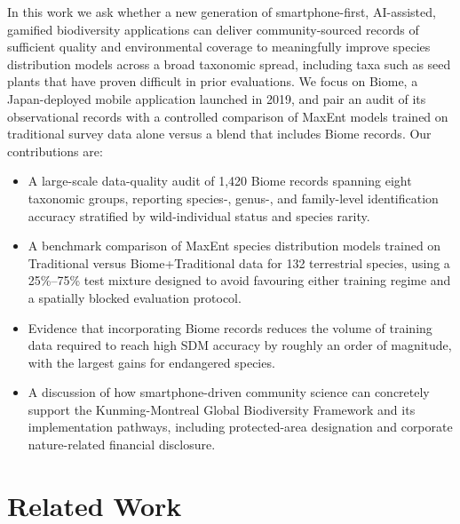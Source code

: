 In this work we ask whether a new generation of smartphone-first, AI-assisted, gamified biodiversity applications can deliver community-sourced records of sufficient quality and environmental coverage to meaningfully improve species distribution models across a broad taxonomic spread, including taxa such as seed plants that have proven difficult in prior evaluations. We focus on Biome, a Japan-deployed mobile application launched in 2019, and pair an audit of its observational records with a controlled comparison of MaxEnt models trained on traditional survey data alone versus a blend that includes Biome records. Our contributions are:

\begin{itemize}
  \item A large-scale data-quality audit of 1,420 Biome records spanning eight taxonomic groups, reporting species-, genus-, and family-level identification accuracy stratified by wild-individual status and species rarity.
  \item A benchmark comparison of MaxEnt species distribution models trained on Traditional versus Biome+Traditional data for 132 terrestrial species, using a 25\%--75\% test mixture designed to avoid favouring either training regime and a spatially blocked evaluation protocol.
  \item Evidence that incorporating Biome records reduces the volume of training data required to reach high SDM accuracy by roughly an order of magnitude, with the largest gains for endangered species.
  \item A discussion of how smartphone-driven community science can concretely support the Kunming-Montreal Global Biodiversity Framework and its implementation pathways, including protected-area designation and corporate nature-related financial disclosure.
\end{itemize}

\section{Related Work}

